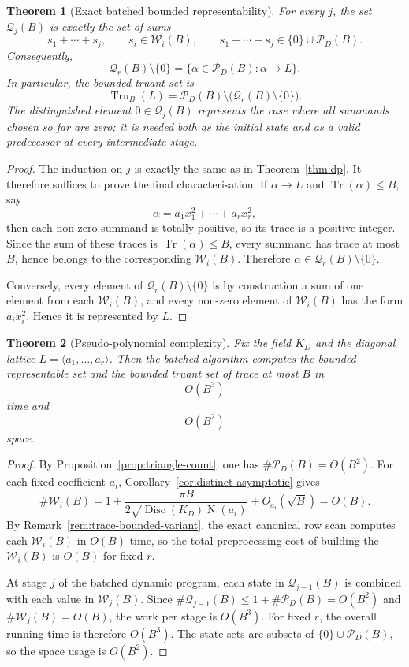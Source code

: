 \documentclass[manuscript]{acmart}
\theoremstyle{plain}
\newtheorem{theorem}{Theorem}[section]
\theoremstyle{definition}
\theoremstyle{nonitalicremark}
\newcommand{\Tr}{\operatorname{Tr}}
\newcommand{\N}{\operatorname{N}}
\newcommand{\Disc}{\operatorname{Disc}}
\newcommand{\cP}{\mathcal{P}}
\newcommand{\cQ}{\mathcal{Q}}
\newcommand{\cW}{\mathcal{W}}
\begin{document}
\begin{theorem}[Exact batched bounded representability]\label{thm:batched}
For every $j$, the set $\cQ_j(B)$ is exactly the set of sums
\[
s_1+\cdots+s_j,
\qquad s_i\in\cW_i(B),
\qquad s_1+\cdots+s_j\in\{0\}\cup\cP_D(B).
\]
Consequently,
\[
\cQ_r(B)\setminus\{0\} = \{\alpha\in\cP_D(B) : \alpha\to L\}.
\]
In particular, the bounded truant set is
\[
\operatorname{Tru}_B(L)=\cP_D(B)\setminus \bigl(\cQ_r(B)\setminus\{0\}\bigr).
\]
The distinguished element $0\in\cQ_j(B)$ represents the case where all summands chosen so far are
zero; it is needed both as the initial state and as a valid predecessor at every intermediate stage.
\end{theorem}

\begin{proof}
The induction on $j$ is exactly the same as in Theorem~\ref{thm:dp}. It therefore suffices to prove
the final characterisation. If $\alpha\to L$ and $\Tr(\alpha)\le B$, say
\[
\alpha=a_1x_1^2+\cdots+a_rx_r^2,
\]
then each non-zero summand is totally positive, so its trace is a positive integer. Since the sum of
these traces is $\Tr(\alpha)\le B$, every summand has trace at most $B$, hence belongs to the
corresponding $\cW_i(B)$. Therefore $\alpha\in\cQ_r(B)\setminus\{0\}$.

Conversely, every element of $\cQ_r(B)\setminus\{0\}$ is by construction a sum of one element from
each $\cW_i(B)$, and every non-zero element of $\cW_i(B)$ has the form $a_i x_i^2$. Hence it is
represented by $L$.
\end{proof}

\begin{theorem}[Pseudo-polynomial complexity]\label{thm:pseudopoly}
Fix the field $K_D$ and the diagonal lattice $L=\langle a_1,\dots,a_r\rangle$. Then the batched
algorithm computes the bounded representable set and the bounded truant set of trace at most $B$ in
\[
O(B^3)
\]
time and
\[
O(B^2)
\]
space.
\end{theorem}

\begin{proof}
By Proposition~\ref{prop:triangle-count}, one has $\#\cP_D(B)=O(B^2)$. For each fixed coefficient
$a_i$, Corollary~\ref{cor:distinct-asymptotic} gives
\[
\#\cW_i(B)=1+\frac{\pi B}{2\sqrt{\Disc(K_D)\N(a_i)}} + O_{a_i}(\sqrt B)=O(B).
\]
By Remark~\ref{rem:trace-bounded-variant}, the exact canonical row scan computes each $\cW_i(B)$ in
$O(B)$ time, so the total preprocessing cost of building the $\cW_i(B)$ is $O(B)$ for fixed $r$.

At stage $j$ of the batched dynamic program, each state in $\cQ_{j-1}(B)$ is combined with each
value in $\cW_j(B)$. Since $\#\cQ_{j-1}(B)\le 1+\#\cP_D(B)=O(B^2)$ and $\#\cW_j(B)=O(B)$, the work
per stage is $O(B^3)$. For fixed $r$, the overall running time is therefore $O(B^3)$. The state sets
are subsets of $\{0\}\cup\cP_D(B)$, so the space usage is $O(B^2)$.
\end{proof}
\end{document}

